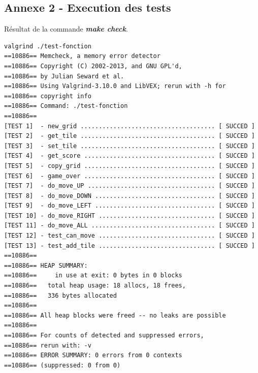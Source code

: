 \documentclass[a4paper]{article}
\begin{document}
\subsection{Annexe 2 - Execution des tests}
\label{sec-7-2}
\noindent
Résultat de la commande \textbf{\emph{make check}}.

\begin{verbatim}
valgrind ./test-fonction
==10886== Memcheck, a memory error detector
==10886== Copyright (C) 2002-2013, and GNU GPL'd, 
==10886== by Julian Seward et al.
==10886== Using Valgrind-3.10.0 and LibVEX; rerun with -h for
==10886== copyright info
==10886== Command: ./test-fonction
==10886== 
[TEST 1]  - new_grid ..................................... [ SUCCED ]
[TEST 2]  - get_tile ..................................... [ SUCCED ]
[TEST 3]  - set_tile ..................................... [ SUCCED ]
[TEST 4]  - get_score .................................... [ SUCCED ]
[TEST 5]  - copy_grid .................................... [ SUCCED ]
[TEST 6]  - game_over .................................... [ SUCCED ]
[TEST 7]  - do_move_UP ................................... [ SUCCED ]
[TEST 8]  - do_move_DOWN ................................. [ SUCCED ]
[TEST 9]  - do_move_LEFT ................................. [ SUCCED ]
[TEST 10] - do_move_RIGHT ................................ [ SUCCED ]
[TEST 11] - do_move_ALL .................................. [ SUCCED ]
[TEST 12] - test_can_move ................................ [ SUCCED ]
[TEST 13] - test_add_tile ................................ [ SUCCED ]
==10886== 
==10886== HEAP SUMMARY:
==10886==     in use at exit: 0 bytes in 0 blocks
==10886==   total heap usage: 18 allocs, 18 frees, 
==10886==   336 bytes allocated
==10886== 
==10886== All heap blocks were freed -- no leaks are possible
==10886== 
==10886== For counts of detected and suppressed errors,
==10886== rerun with: -v
==10886== ERROR SUMMARY: 0 errors from 0 contexts
==10886== (suppressed: 0 from 0)
\end{verbatim}



\newpage
\end{document}
